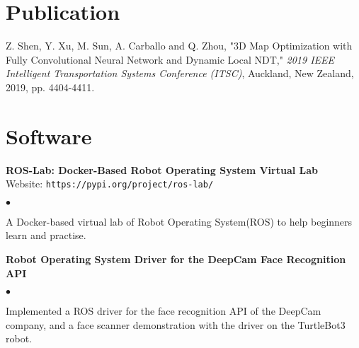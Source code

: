 \documentclass[margin,line,pifont,palatino,courier]{res}
\newenvironment{list2}{
	\begin{list}{$\bullet$}{%
			\setlength{\itemsep}{0in}
			\setlength{\parsep}{0in} \setlength{\parskip}{0in}
			\setlength{\topsep}{0in} \setlength{\partopsep}{0in}
			\setlength{\leftmargin}{0.2in}}}{\end{list}}
\begin{document}
\begin{resume}
		\section{\sc Publication}
			
			\begin{enumerate}[{[1]}]
				\item Z. Shen, Y. Xu, M. Sun, A. Carballo and Q. Zhou, "3D Map Optimization with Fully Convolutional Neural Network and Dynamic Local NDT," \textsl{2019 IEEE Intelligent Transportation Systems Conference (ITSC)}, Auckland, New Zealand, 2019, pp. 4404-4411.
			\end{enumerate}
		
		\section{\sc Software}
		
		
		{\bf ROS-Lab: Docker-Based Robot Operating System Virtual Lab} \\
		Website: \verb+https://pypi.org/project/ros-lab/+ 
		\begin{list2}
			\item A Docker-based virtual lab of Robot Operating System(ROS) to help beginners learn and practise.
		\end{list2}
		
		{\bf Robot Operating System Driver for the DeepCam Face Recognition API} 
		\begin{list2}
			\item Implemented a ROS driver for the face recognition API of the DeepCam company, and a face scanner demonstration with the driver on the TurtleBot3 robot.
		\end{list2}
	

\end{resume}
\end{document}
